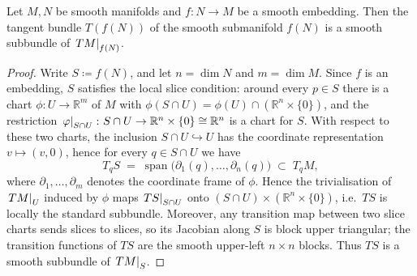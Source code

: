 \begin{lemma}\label{lem:morse-tangendBundleSMoothEmbeddingIsSmooth}
	Let $M,N$ be smooth manifolds and $f:N\to M$ be a smooth embedding. Then the tangent bundle $T(f(N))$ of the smooth submanifold $f(N)$ is a smooth subbundle of $\left.TM\right|_{f(N)}$.
\end{lemma}
\begin{proof}
    Write $S \coloneqq f(N)$, and let $n = \dim N$ and $m = \dim M$. Since $f$ 
    is an embedding, $S$ satisfies the local slice condition: around every 
    $p \in S$ there is a chart $\phi \colon U \to \mathbb{R}^m$ of $M$ with 
    $\phi(S \cap U) = \phi(U) \cap (\mathbb{R}^n \times \{0\})$, and the 
    restriction $\left.\varphi\right|_{S \cap U} \colon S \cap U \to \mathbb{R}^n 
    \times \{0\} \cong \mathbb{R}^n$ is a chart for $S$. With respect to these 
    two charts, the inclusion $S \cap U \hookrightarrow U$ has the coordinate 
    representation $v \mapsto (v,0)$, hence for every $q \in S \cap U$ we have
    \begin{equation*}
        T_q S \;=\; \operatorname{span}\big(\partial_1(q),
        \dots, \partial_n(q) \big) \;\subset\; T_q M,
    \end{equation*}
    where $\partial_1,\dots,\partial_m$ denotes the coordinate frame of $\phi$.
    Hence the trivialisation of $\left.TM\right|_{U}$ induced by $\phi$ maps
    $\left.TS\right|_{S \cap U}$ onto $(S \cap U) \times (\mathbb{R}^n \times \{0\})$, 
    i.e.\ $TS$ is locally the standard subbundle. Moreover, any transition map 
    between two slice charts sends slices to slices, so its Jacobian along $S$ 
    is block upper triangular; the transition functions of $TS$ are the smooth 
    upper-left $n \times n$ blocks. Thus $TS$ is a smooth subbundle of 
    $\left.TM\right|_{S}$.
\end{proof}



